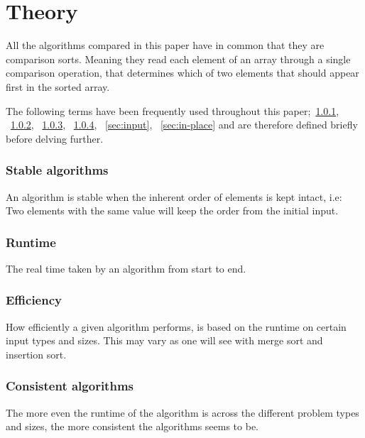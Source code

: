\documentclass[sigconf, nonacm, natbib, screen, balance=False]{acmart}
\begin{document}

\section{Theory}\label{sec:theory}

All the algorithms compared in this paper have in common that they are comparison sorts. Meaning they read each element of an array through a single comparison operation, that determines which of two elements that should appear first in the sorted array.

The following terms have been frequently used throughout this paper;~\ref{sec:stable}, ~\ref{sec:runtime}, ~\ref{sec:efficiency}, ~\ref{sec:consistent}, ~\ref{sec:input}, ~\ref{sec:in-place} and are therefore defined briefly before delving further.  

\subsubsection{Stable algorithms}\label{sec:stable}
An algorithm is stable when the inherent order of elements is kept intact, i.e: Two elements with the same value will keep the order from the initial input.

\subsubsection{Runtime}\label{sec:runtime}
The real time taken by an algorithm from start to end. 

\subsubsection{Efficiency}\label{sec:efficiency}
How efficiently a given algorithm performs, is based on the runtime on certain input types and sizes. This may vary as one will see with merge sort and insertion sort. 

\subsubsection{Consistent algorithms}\label{sec:consistent}
 The more even the runtime of the algorithm is across the different problem types and sizes, the more consistent the algorithms seems to be.
 
\end{document}
